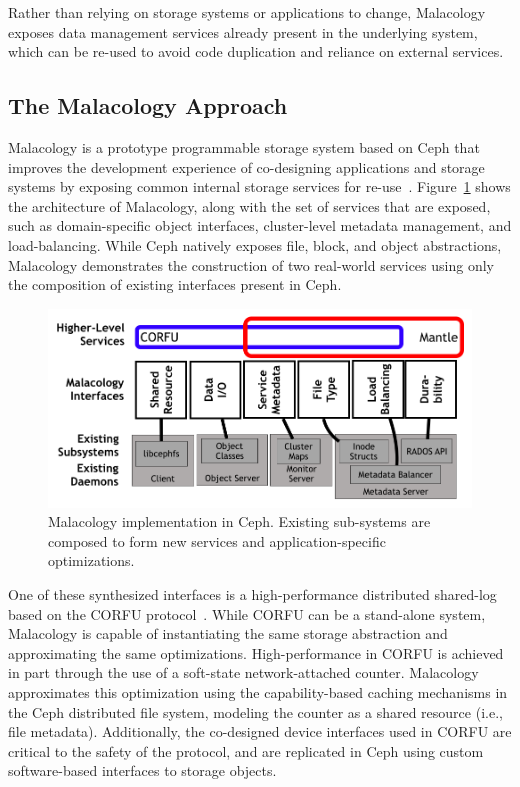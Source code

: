 Rather than relying on storage systems or applications to change, Malacology
exposes data management services already present in the underlying system,
which can be re-used to avoid code duplication and reliance on external
services.

\subsection{The Malacology Approach}
\label{mala}

Malacology is a prototype programmable storage system based on Ceph that
improves the development experience of co-designing applications and storage
systems by exposing common internal storage services for
re-use~\cite{sevilla:eurosys17}. Figure~\ref{fig:malacology} shows the
architecture of Malacology, along with the set of services that are exposed,
such as domain-specific object interfaces, cluster-level metadata management,
and load-balancing. While Ceph natively exposes file, block, and object
abstractions, Malacology demonstrates the construction of two real-world
services using only the composition of existing interfaces present in Ceph.

\begin{figure}[t]
\centering
\includegraphics[width=1.0\linewidth]{implementation-overview.png}
\caption{Malacology implementation in Ceph. Existing sub-systems are composed
    to form new services and application-specific optimizations.}
\label{fig:malacology}
\end{figure}

One of these synthesized interfaces is a high-performance distributed
shared-log
based on the CORFU protocol~\cite{balakrishnan:nsdi12}.  While CORFU can
be a stand-alone system, Malacology is capable of instantiating the same storage
abstraction and approximating the same optimizations. High-performance in CORFU
is achieved in part through the use of a soft-state network-attached counter.
Malacology approximates this optimization using the capability-based caching
mechanisms in the Ceph distributed file system, modeling the counter as a
shared resource (i.e., file metadata). Additionally, the co-designed device
interfaces used in CORFU are critical to the safety of the protocol, and are
replicated in Ceph using custom software-based interfaces to storage objects.


